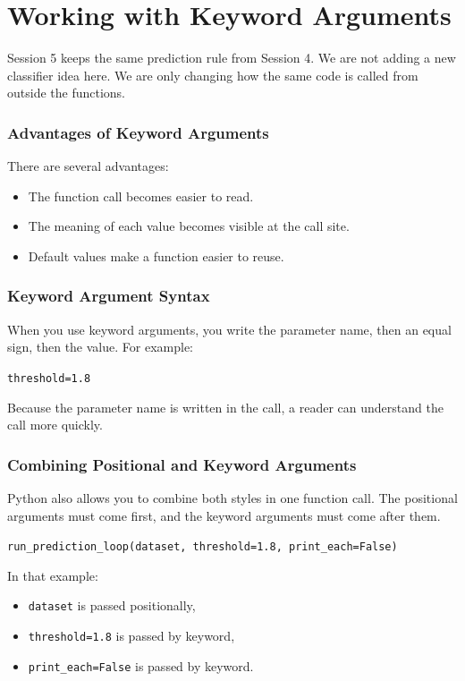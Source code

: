 \section{Working with Keyword Arguments}
Session 5 keeps the same prediction rule from Session 4. We are not adding a new classifier idea here. We are only changing how the same code is called from outside the functions.

\subsubsection{Advantages of Keyword Arguments}
There are several advantages:
\begin{itemize}\setlength{\itemsep}{0pt}
    \item The function call becomes easier to read.
    \item The meaning of each value becomes visible at the call site.
    \item Default values make a function easier to reuse.
\end{itemize}

\subsubsection{Keyword Argument Syntax}
When you use keyword arguments, you write the parameter name, then an equal sign, then the value. For example:
\begin{center}
    \texttt{threshold=1.8}
\end{center}

\noindent
Because the parameter name is written in the call, a reader can understand the call more quickly.

\subsubsection{Combining Positional and Keyword Arguments}
Python also allows you to combine both styles in one function call. The positional arguments must come first, and the keyword arguments must come after them.

\begin{center}
    \texttt{run\_prediction\_loop(dataset, threshold=1.8, print\_each=False)}
\end{center}

\noindent
In that example:
\begin{itemize}
    \item \texttt{dataset} is passed positionally,
    \item \texttt{threshold=1.8} is passed by keyword,
    \item \texttt{print\_each=False} is passed by keyword.
\end{itemize}

